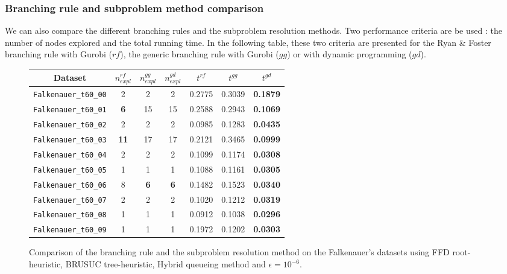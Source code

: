 \subsubsection{Branching rule and subproblem method comparison}

We can also compare the different branching rules and the subproblem resolution methods. Two performance criteria are be used : the number of nodes explored and the total running time. In the following table, these two criteria are presented for the Ryan \& Foster branching rule with Gurobi ($rf$), the generic branching rule with Gurobi ($gg$) or with dynamic programming ($gd$). 

\begin{figure}[!ht]
	\centering
	\small{
	\begin{tabular}{|ccccccc|}
		\hline
		\rowcolor{gray!50}
		Dataset & $n_{expl}^{rf}$ & $n_{expl}^{gg}$ & $n_{expl}^{gd}$ & $t^{rf}$ & $t^{gg}$ & $t^{gd}$ \\
		\hline
		\texttt{Falkenauer\_t60\_00} & 2 & 2 & 2 & 0.2775 & 0.3039 & \textbf{0.1879} \\
		\texttt{Falkenauer\_t60\_01} & \textbf{6} & 15 & 15 & 0.2588 & 0.2943 & \textbf{0.1069} \\
		\texttt{Falkenauer\_t60\_02} & 2 & 2 & 2 & 0.0985 & 0.1283 & \textbf{0.0435} \\
		\texttt{Falkenauer\_t60\_03} & \textbf{11} & 17 & 17 & 0.2121 & 0.3465 & \textbf{0.0999} \\
		\texttt{Falkenauer\_t60\_04} & 2 & 2 & 2 & 0.1099 & 0.1174 & \textbf{0.0308} \\
		\texttt{Falkenauer\_t60\_05} & 1 & 1 & 1 & 0.1088 & 0.1161 & \textbf{0.0305} \\
		\texttt{Falkenauer\_t60\_06} & 8 & \textbf{6} & \textbf{6} & 0.1482 & 0.1523 & \textbf{0.0340} \\
		\texttt{Falkenauer\_t60\_07} & 2 & 2 & 2 & 0.1020 & 0.1212 & \textbf{0.0319} \\
		\texttt{Falkenauer\_t60\_08} & 1 & 1 & 1 & 0.0912 & 0.1038 & \textbf{0.0296} \\
		\texttt{Falkenauer\_t60\_09} & 1 & 1 & 1 & 0.1972 & 0.1202 & \textbf{0.0303} \\
		\hline  
	\end{tabular}
	\caption{Comparison of the branching rule and the subproblem resolution method on the Falkenauer's datasets using FFD root-heuristic, BRUSUC tree-heuristic, Hybrid queueing method and $\epsilon=10^{-6}$.}
	}
\end{figure}

